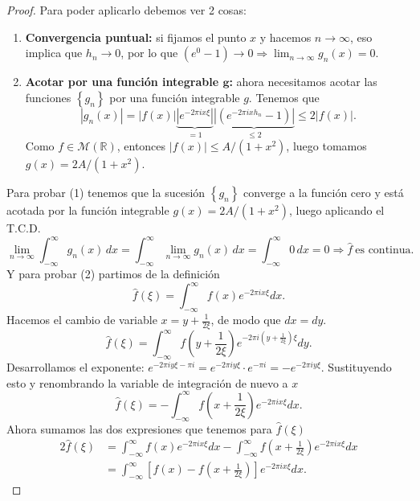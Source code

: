 \documentclass[12pt]{article}
\newcommand{\R}{\mathbb{R}}
\theoremstyle{plain}
\theoremstyle{definition}
\numberwithin{equation}{section}
\begin{document}
\begin{proof}
                Para poder aplicarlo debemos ver 2 cosas:
                \begin{enumerate}
                    \item[\textbf{1.}]\textbf{Convergencia puntual:} si fijamos el punto \(x\) y hacemos \(n \to \infty\), eso implica que \(h_n \to 0\), por lo que \((e^0-1) \to 0 \Rightarrow \lim_{n \to \infty} g_n(x) = 0\).
                    \item[\textbf{2.}]\textbf{Acotar por una función integrable \(\bm{g}\):} ahora necesitamos acotar las funciones \(\left\{g_n\right\}\) por una función integrable \(g\). Tenemos que
                    $$ \left\lvert g_n(x)\right\rvert = \left\lvert f(x)\right\rvert \underbrace{\left\lvert e^{-2\pi ix\xi} \right\rvert}_{=1} \underbrace{\left\lvert (e^{-2\pi i x h_n} - 1) \right\rvert}_{\leq 2} \leq  2\left\lvert f(x)\right\rvert. $$ Como \(f \in \mathcal{M}(\R)\), entonces \(\left\lvert f(x)\right\rvert \leq A/(1+x^2)\), luego tomamos \(g(x) = 2A/(1+x^2)\).
                \end{enumerate}
                Para probar (1) tenemos que la sucesión \(\left\{g_n\right\}\) converge a la función cero y está acotada por la función integrable \(g(x) = 2A/(1+x^2)\), luego aplicando el T.C.D.
                $$ \lim_{n \to \infty} \int_{-\infty}^{\infty} g_n(x)\,dx = \int_{-\infty}^{\infty} \lim_{n \to \infty} g_n(x)\,dx = \int_{-\infty}^{\infty} 0\,dx = 0 \Rightarrow \hat{f}\ \text{es continua}.$$
                Y para probar (2) partimos de la definición
                $$\hat{f}(\xi) = \int_{-\infty}^{\infty} f(x) e^{-2\pi i x \xi} dx.$$
                Hacemos el cambio de variable $x = y + \frac{1}{2\xi}$, de modo que $dx = dy.$
                $$\hat{f}(\xi) = \int_{-\infty}^{\infty} f\left(y + \frac{1}{2\xi}\right) e^{-2\pi i \left(y + \frac{1}{2\xi}\right)\xi} dy.$$
                Desarrollamos el exponente: $e^{-2\pi i y \xi - \pi i} = e^{-2\pi i y \xi} \cdot e^{-\pi i} = -e^{-2\pi i y \xi}$. Sustituyendo esto y renombrando la variable de integración de nuevo a $x$
                $$\hat{f}(\xi) = -\int_{-\infty}^{\infty} f\left(x + \frac{1}{2\xi}\right) e^{-2\pi i x \xi} dx.$$
                Ahora sumamos las dos expresiones que tenemos para $\hat{f}(\xi)$
                \begin{align*}
                    2\hat{f}(\xi) &= \int_{-\infty}^{\infty} f(x) e^{-2\pi i x \xi} dx - \int_{-\infty}^{\infty} f\left(x + \frac{1}{2\xi}\right) e^{-2\pi i x \xi} dx\\
                    &= \int_{-\infty}^{\infty} \left[ f(x) - f\left(x + \frac{1}{2\xi}\right) \right] e^{-2\pi i x \xi} dx.

\end{align*}
\end{proof}
\end{document}

